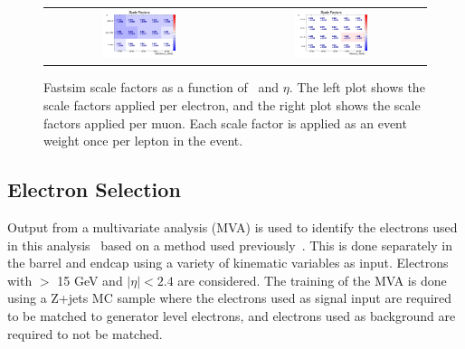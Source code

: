\begin{figure}[!ht]
  \begin{center}
    \begin{tabular}{cc}
      \includegraphics[width=0.4\textwidth]{evtsel/figs/FS_sf_el_tight_mini01.pdf}  &
      \includegraphics[width=0.4\textwidth]{evtsel/figs/FS_sf_mu_mediumID_mini02.pdf}  \\
    \end{tabular}
    \caption{
      \label{fig:FS_sfs}
      Fastsim scale factors as a function of \pt\ and $\eta$.
      The left plot shows the scale factors applied per electron,
      and the right plot shows the scale factors applied per muon.
      Each scale factor is applied as an event weight once per lepton in the event.
    }
  \end{center}
\end{figure}

\clearpage

\subsection{Electron Selection}
\label{ssec:elsel}
Output from a multivariate analysis (MVA) is used to identify the electrons used in this analysis~\cite{egamma13tev} based on a method used previously~\cite{egamma8tev}.
This is done separately in the barrel and endcap using a variety of kinematic variables as input.
Electrons with \pt $>$ 15 GeV and $|\eta|<2.4$ are considered.
The training of the MVA is done using a Z+jets MC sample where the electrons used as signal input are
required to be matched to generator level electrons, and electrons used as background are required to not be matched.


